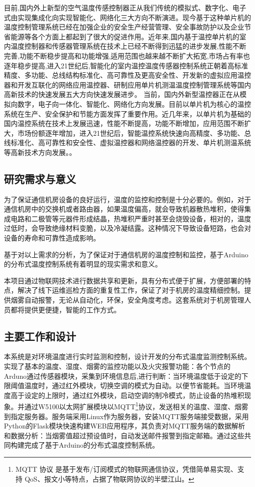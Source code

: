 目前,国内外上新型的空气温度传感控制器正从我们传统的模拟式、数字化、电子式由实现集成化向实现智能化、网络化三大方向不断演进。现今基于这种单片机的温度控制管理系统已经在加强企业的安全生产经营管理、安全事故防护以及企业节省能源等各个方面上都起到了很大的促进作用。近年来,国内基于温控单片机的室内温度控制器和传感器管理系统在技术上已经不断得到迅猛的进步发展,性能不断完善,功能不断稳步提高和功能增强,适用范围也越来越不断扩大拓宽,市场占有率也逐年稳步提高,进入21世纪后,智能化的室内温控温度传感器控制系统正朝着高标准精度、多功能、总线结构标准化、高可靠性及更高安全性、开发新的虚拟应用温控器和开发互联化的网络应用温控器、研制应用单片机测温温度控制管理系统等国内高新技术的快速发展五大方向快速发展进步。
当前，国内外新型温控器正在从模拟向数字，电子向一体化、智能化、网络化方向发展。目前以单片机为核心的温控系统在生产、安全保护和节能方面发挥了重要作用。近几年来，以单片机为基础的国内温控系统在技术上发展迅速，性能不断提高，功能不断增加，应用范围不断扩大，市场份额逐年增加，进入21世纪后，智能温控系统快速向高精度、多功能、总线标准化、高可靠性和安全性、虚拟温控器和网络温控器的开发、单片机测温系统等高新技术方向发展。。


\subsection{研究需求与意义}

为了保证通信机房设备的良好运行，温度的监控和控制是十分必要的。例如，对于通信机房中的交换机或者路由器，如果温度偏高，就会导致机器散热堆积，使得集成电路和二极管等元器件形成结晶，热堆积严重时甚至会烧毁设备，相对的，温度过低时，会导致绝缘材料变脆，以及冷凝结露。这种情况下导致设备短路，也会对设备的寿命和可靠性造成影响。

基于对以上需求的分析，为了保证对于通信机房的温度控制和监控，基于Arduino的分布式温度控制系统有着明显的现实需求和意义。

本项目通过物联网技术进行数据共享和更新，具有分布式便于扩展，方便部署的特点，解决了线下运维巡检方面的重复性工作，保证了对于机房的温度精细控制。提供烟雾自动报警，无论从自动化，环保，安全角度考虑。这套系统对于机房管理人员都将提供更便捷，智能的工作方式。


\subsection{主要工作和设计}

本系统是对环境温度进行实时监测和控制，设计开发的分布式温度监测控制系统。实现了基本的温度、湿度、烟雾的监控功能以及火灾报警功能：各个节点的Arduno通过传感器模块，采集到环境信息后,进行判断：当环境温度低于设定的下限阈值温度时，通过红外模块，切换空调的模式为自动。以便节省能耗。当环境温度高于设定的上限时，通过红外模块，启动空调的制冷模式，防止设备的热堆积现象。并通过W5100以太网扩展模块以MQTT\footnote{MQTT 协议 是基于发布/订阅模式的物联网通信协议，凭借简单易实现、支持 QoS、报文小等特点，占据了物联网协议的半壁江山。}协议，发送相关的温度、湿度、烟雾到指定服务器。服务端采用Linux作为服务器，安装MQTT服务端接受数据，采用Python的Flask模块快速构建WEB应用程序，其负责对MQTT服务端的数据解析和数据分析：当烟雾值超过预设值时，自动发送邮件报警到指定邮箱。通过这些共同构建完成了基于Arduino的分布式温度控制系统。

